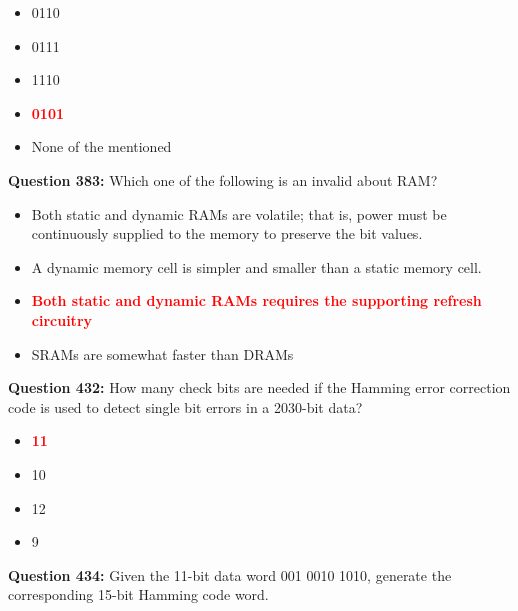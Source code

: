 \documentclass[12pt,a4paper]{article}
\begin{document}
\begin{itemize}
    \item[\textbf{A.}] 0110
    \item[\textbf{B.}] 0111
    \item[\textbf{C.}] 1110
    \item[\textbf{D.}] \textcolor{red}{\textbf{0101}}
    \item[\textbf{E.}] None of the mentioned
\end{itemize}

\vspace{0.5cm}

\vspace{0.5cm}

\textbf{Question 383:} Which one of the following is an invalid about RAM?

\begin{itemize}
    \item[\textbf{A.}] Both static and dynamic RAMs are volatile; that is, power must be continuously supplied to the memory to preserve the bit values.
    \item[\textbf{B.}] A dynamic memory cell is simpler and smaller than a static memory cell.
    \item[\textbf{C.}] \textcolor{red}{\textbf{Both static and dynamic RAMs requires the supporting refresh circuitry}}
    \item[\textbf{D.}] SRAMs are somewhat faster than DRAMs
\end{itemize}

\vspace{0.5cm}

\vspace{0.5cm}

\textbf{Question 432:} How many check bits are needed if the Hamming error correction code is used to detect single bit errors in a 2030-bit data?

\begin{itemize}
    \item[\textbf{A.}] \textcolor{red}{\textbf{11}}
    \item[\textbf{B.}] 10
    \item[\textbf{C.}] 12
    \item[\textbf{D.}] 9
\end{itemize}

\vspace{0.5cm}

\vspace{0.5cm}

\textbf{Question 434:} Given the 11-bit data word 001 0010 1010, generate the corresponding 15-bit Hamming code word.
\end{document}
